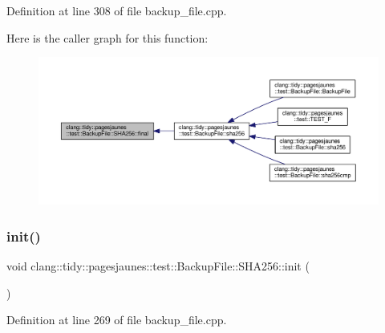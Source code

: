 Definition at line 308 of file backup\+\_\+file.\+cpp.

Here is the caller graph for this function\+:
\nopagebreak
\begin{figure}[H]
\begin{center}
\leavevmode
\includegraphics[width=350pt]{classclang_1_1tidy_1_1pagesjaunes_1_1test_1_1_backup_file_1_1_s_h_a256_a03f35e13e8e122fef9e97e0fc1864307_icgraph}
\end{center}
\end{figure}
\mbox{\label{classclang_1_1tidy_1_1pagesjaunes_1_1test_1_1_backup_file_1_1_s_h_a256_ab3f4a220a3cb829f17b18fac80d3dfa5}} 
\subsubsection{\texorpdfstring{init()}{init()}}
{\footnotesize\ttfamily void clang\+::tidy\+::pagesjaunes\+::test\+::\+Backup\+File\+::\+S\+H\+A256\+::init (\begin{DoxyParamCaption}{ }\end{DoxyParamCaption})}



Definition at line 269 of file backup\+\_\+file.\+cpp.

